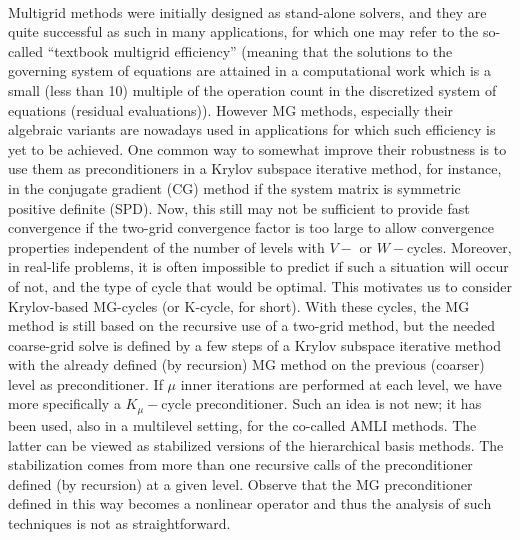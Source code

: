 \\
Multigrid methods were initially designed as stand-alone solvers, and they are
quite successful as such in many applications, for which one may refer to the
so-called ``textbook multigrid efficiency'' (meaning that the solutions to the
governing system of equations are attained in a computational work which is a
small (less than 10) multiple of the operation count in the discretized system
of equations (residual evaluations)). However MG methods, especially their
algebraic variants are nowadays used in applications for which such efficiency
is yet to be achieved. One common way to somewhat improve their robustness is
to use them as preconditioners in a Krylov subspace iterative method, for
instance, in the conjugate gradient (CG) method if the system matrix is
symmetric positive definite (SPD). Now, this still may not be sufficient to
provide fast convergence if the two-grid convergence factor is too large to
allow convergence properties independent of the number of levels with $V-$ or
$W-$cycles. Moreover, in real-life problems, it is often impossible to predict
if such a situation will occur of not, and the type of cycle that would be
optimal. This motivates us to consider Krylov-based MG-cycles (or K-cycle, for
short). With these cycles, the MG method is still based on the recursive use
of a two-grid method, but the needed coarse-grid solve is defined by a few
steps of a Krylov subspace iterative method with the already defined (by
recursion) MG method on the previous (coarser) level as preconditioner. If
$\mu$ inner iterations are performed at each level, we have more specifically
a $K_{\mu}-$cycle preconditioner. Such an idea is not new; it has been used,
also in a multilevel setting, for the co-called AMLI methods. The latter can
be viewed as stabilized versions of the hierarchical basis methods. The
stabilization comes from more than one recursive calls of the preconditioner
defined (by recursion) at a given level. Observe that the MG preconditioner
defined in this way becomes a nonlinear operator and thus the analysis of such
techniques is not as straightforward.
